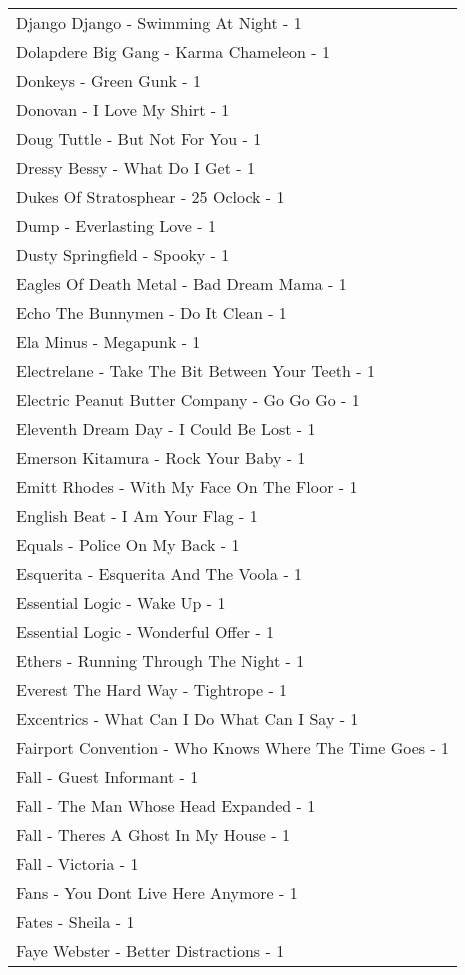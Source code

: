 \documentclass[
]{article}
\begin{document}
\begin{longtable}{l}
Django Django - Swimming At Night - 1 \\ 
Dolapdere Big Gang - Karma Chameleon - 1 \\ 
Donkeys - Green Gunk - 1 \\ 
Donovan - I Love My Shirt - 1 \\ 
Doug Tuttle - But Not For You - 1 \\ 
Dressy Bessy - What Do I Get - 1 \\ 
Dukes Of Stratosphear - 25 Oclock - 1 \\ 
Dump - Everlasting Love - 1 \\ 
Dusty Springfield - Spooky - 1 \\ 
Eagles Of Death Metal - Bad Dream Mama - 1 \\ 
Echo The Bunnymen - Do It Clean - 1 \\ 
Ela Minus - Megapunk - 1 \\ 
Electrelane - Take The Bit Between Your Teeth - 1 \\ 
Electric Peanut Butter Company - Go Go Go - 1 \\ 
Eleventh Dream Day - I Could Be Lost - 1 \\ 
Emerson Kitamura - Rock Your Baby - 1 \\ 
Emitt Rhodes - With My Face On The Floor - 1 \\ 
English Beat - I Am Your Flag - 1 \\ 
Equals - Police On My Back - 1 \\ 
Esquerita - Esquerita And The Voola - 1 \\ 
Essential Logic - Wake Up - 1 \\ 
Essential Logic - Wonderful Offer - 1 \\ 
Ethers - Running Through The Night - 1 \\ 
Everest The Hard Way - Tightrope - 1 \\ 
Excentrics - What Can I Do What Can I Say - 1 \\ 
Fairport Convention - Who Knows Where The Time Goes - 1 \\ 
Fall - Guest Informant - 1 \\ 
Fall - The Man Whose Head Expanded - 1 \\ 
Fall - Theres A Ghost In My House - 1 \\ 
Fall - Victoria - 1 \\ 
Fans - You Dont Live Here Anymore - 1 \\ 
Fates - Sheila - 1 \\ 
Faye Webster - Better Distractions - 1 \\ 

\end{longtable}
\end{document}
